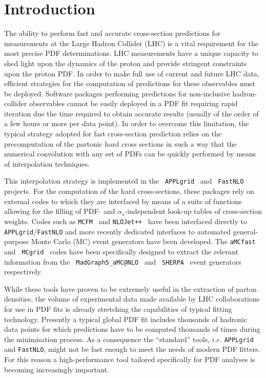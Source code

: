\documentclass[preprint,12pt]{elsarticle}
\begin{document}
\clearpage

\tableofcontents

\section{Introduction}\label{sec:intro}

The ability to perform fast and accurate cross-section predictions for
measurements at the Large Hadron Collider (LHC) is a vital requirement
for the most precise PDF determinations. LHC measurements have a
unique capacity to shed light upon the dynamics of the proton and
provide stringent constraints upon the proton PDF. In order to make
full use of current and future LHC data, efficient strategies for the
computation of predictions for these observables must be
deployed. Software packages performing predictions for non-inclusive
hadron-collider observables cannot be easily deployed in a PDF fit
requiring rapid iteration due the time required to obtain accurate
results (usually of the order of a few hours or more per data
point). In order to overcome this limitation, the typical strategy
adopted for fast cross-section prediction relies on the precomputation
of the partonic hard cross sections in such a way that the numerical
convolution with any set of PDFs can be quickly performed by means of
interpolation techniques.

This interpolation strategy is implemented in the {\tt
  APPLgrid}~\cite{Carli:2010rw} and {\tt
  FastNLO}~\cite{Wobisch:2011ij} projects. For the computation of the
hard cross-sections, these packages rely on external codes to which
they are interfaced by means of a suite of functions allowing for the
filling of PDF- and $\alpha_s$-independent look-up tables of
cross-section weights. Codes such as {\tt MCFM}~\cite{Campbell:2010ff}
and {\tt NLOJet++}~\cite{Nagy:2003tz} have been interfaced directly to
{\tt APPLgrid}/{\tt FastNLO} and more recently dedicated interfaces to
automated general-purpose Monte Carlo (MC) event generators have been
developed. The {\tt aMCfast}~\cite{Bertone:2014zva} and {\tt
  MCgrid}~\cite{DelDebbio:2013kxa} codes have been specifically
designed to extract the relevant information from the {\tt
  MadGraph5\_aMC@NLO}~\cite{Alwall:2014hca} and {\tt
  SHERPA}~\cite{Gleisberg:2008ta} event generators respectively.

While these tools have proven to be extremely useful in the extraction
of parton densities, the volume of experimental data made available by
LHC collaborations for use in PDF fits is already stretching the
capabilities of typical fitting technology. Presently a typical global
PDF fit includes thousands of hadronic data points for which
predictions have to be computed thousands of times during the
minimisation process. As a consequence the ``standard'' tools, $i.e.$
{\tt APPLgrid} and {\tt FastNLO}, might not be fast enough to meet the
needs of modern PDF fitters. For this reason a high-performance tool
tailored specifically for PDF analyses is becoming increasingly
important.
\end{document}
